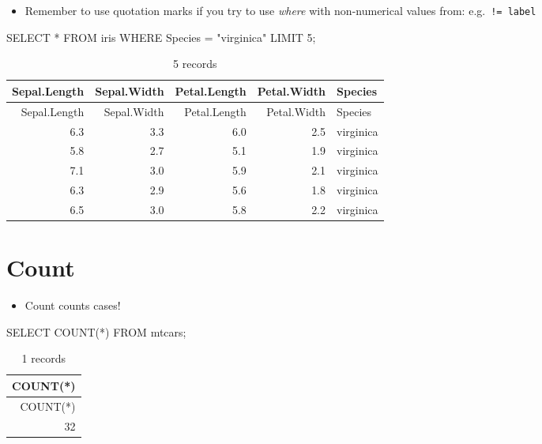 \documentclass[
  letterpaper,
  DIV=11,
  numbers=noendperiod]{scrreprt}
\newenvironment{Shaded}{\begin{snugshade}}{\end{snugshade}}
\newcommand{\DecValTok}[1]{\textcolor[rgb]{0.68,0.00,0.00}{#1}}
\newcommand{\FunctionTok}[1]{\textcolor[rgb]{0.28,0.35,0.67}{#1}}
\newcommand{\KeywordTok}[1]{\textcolor[rgb]{0.00,0.23,0.31}{#1}}
\newcommand{\NormalTok}[1]{\textcolor[rgb]{0.00,0.23,0.31}{#1}}
\newcommand{\OperatorTok}[1]{\textcolor[rgb]{0.37,0.37,0.37}{#1}}
\newcommand{\OtherTok}[1]{\textcolor[rgb]{0.00,0.23,0.31}{#1}}
\providecommand{\tightlist}{%
  \setlength{\itemsep}{0pt}\setlength{\parskip}{0pt}}\usepackage{longtable,booktabs,array}
\begin{document}
\begin{itemize}
\tightlist
\item
  Remember to use quotation marks if you try to use \emph{where} with
  non-numerical values from:
  e.g.~\texttt{!=\ \textquotesingle{}label\textquotesingle{}}
\end{itemize}

\begin{Shaded}
\begin{Highlighting}[]
\KeywordTok{SELECT} \OperatorTok{*} \KeywordTok{FROM}\NormalTok{ iris }\KeywordTok{WHERE}\NormalTok{ Species }\OperatorTok{=} \OtherTok{"virginica"}  \KeywordTok{LIMIT} \DecValTok{5}\NormalTok{;}
\end{Highlighting}
\end{Shaded}

\begin{longtable}[]{@{}rrrrl@{}}
\caption{5 records}\tabularnewline
\toprule()
Sepal.Length & Sepal.Width & Petal.Length & Petal.Width & Species \\
\midrule()
\endfirsthead
\toprule()
Sepal.Length & Sepal.Width & Petal.Length & Petal.Width & Species \\
\midrule()
\endhead
6.3 & 3.3 & 6.0 & 2.5 & virginica \\
5.8 & 2.7 & 5.1 & 1.9 & virginica \\
7.1 & 3.0 & 5.9 & 2.1 & virginica \\
6.3 & 2.9 & 5.6 & 1.8 & virginica \\
6.5 & 3.0 & 5.8 & 2.2 & virginica \\
\bottomrule()
\end{longtable}

\hypertarget{count}{%
\section{Count}\label{count}}

\begin{itemize}
\tightlist
\item
  Count counts cases!
\end{itemize}

\begin{Shaded}
\begin{Highlighting}[]
\KeywordTok{SELECT} \FunctionTok{COUNT}\NormalTok{(}\OperatorTok{*}\NormalTok{) }\KeywordTok{FROM}\NormalTok{ mtcars;}
\end{Highlighting}
\end{Shaded}

\begin{longtable}[]{@{}r@{}}
\caption{1 records}\tabularnewline
\toprule()
COUNT(*) \\
\midrule()
\endfirsthead
\toprule()
COUNT(*) \\
\midrule()
\endhead
32 \\
\bottomrule()
\end{longtable}
\end{document}
